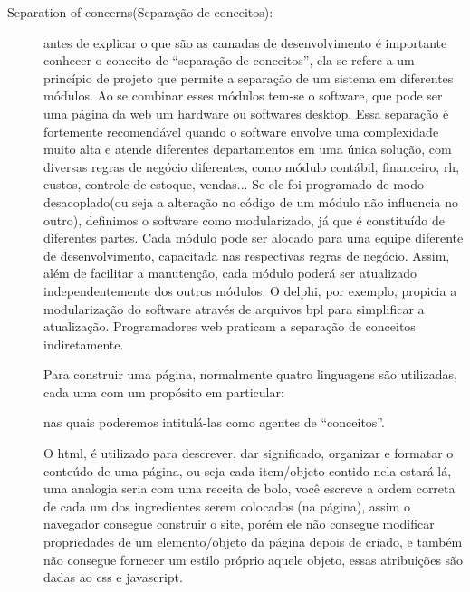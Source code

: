 	\begin{description} 
		\item[Separation of concerns(Separação de conceitos):]
			antes de explicar o que são as camadas de desenvolvimento é importante conhecer o conceito de “separação de conceitos”, ela se refere a um princípio de projeto que permite a separação de um sistema em diferentes módulos. Ao se combinar esses módulos tem-se o software, que pode ser uma página da web um hardware ou softwares desktop. Essa separação é fortemente recomendável quando o software envolve uma complexidade muito alta e atende diferentes departamentos em uma única solução, com diversas regras de negócio diferentes, como módulo contábil, financeiro, rh, custos, controle de estoque, vendas... Se ele foi programado de modo desacoplado(ou seja a alteração no código de um módulo não influencia no outro), definimos o software como modularizado, já que é constituído de diferentes partes. Cada módulo pode ser alocado para uma equipe diferente de desenvolvimento, capacitada nas respectivas regras de negócio. Assim, além de facilitar a manutenção, cada módulo poderá ser atualizado independentemente dos outros módulos. O delphi, por exemplo, propicia a modularização do software através de arquivos bpl para simplificar a atualização. Programadores web praticam a separação de conceitos indiretamente.
			\cite{SeparationOfConcerns}
			
			Para construir uma página, normalmente quatro linguagens são utilizadas, cada uma com um propósito em particular:
			
			\begin{description}
				\setlength\itemindent{15pt}
				\item[•] {HTML}
				\item[•] {CSS}
				\item[•] {JAVASCRIPT}
				\item[•] {BACKEND(PHYTON)}
			\end{description}
				
			nas quais poderemos intitulá-las como agentes de “conceitos”.
			
			  
			O html, é utilizado para descrever, dar significado, organizar e formatar o conteúdo de uma página, ou seja cada item/objeto contido nela estará lá, uma analogia seria com uma receita de bolo, você escreve a ordem correta de cada um dos ingredientes serem colocados (na página), assim o navegador consegue construir o site, porém ele não consegue modificar propriedades de um elemento/objeto da página depois de criado, e também não consegue fornecer um estilo próprio aquele objeto, essas atribuições são dadas ao css e javascript.
			\cite{torres2018html}\\
						

\end{description}
